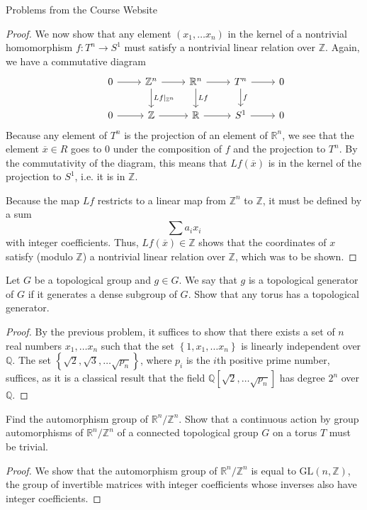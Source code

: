 \documentclass[12pt]{article}
\newcommand{\Q}{\mathbb{Q}}
\newcommand{\Z}{\mathbb{Z}}
\newcommand{\R}{\mathbb{R}}
\theoremstyle{definition}
\newenvironment{problem}[2][Problem]{\begin{trivlist}
\item[\hskip \labelsep {\bfseries #1}\hskip \labelsep {\bfseries #2.}]}{\end{trivlist}}
\begin{document}
\begin{section}{Problems from the Course Website}
\begin{problem}{4}
\begin{proof}
				We now show that any element $(x_1, \dots x_n)$ in the kernel of a nontrivial homomorphism $f: T^n \to S^1$ must satisfy a nontrivial linear relation over $\Z$. Again, we have a commutative diagram
				\[\begin{tikzcd}
					&0 \arrow[r, ""] & \Z^n \arrow[r ] \arrow[d,"Lf \lvert_{\Z^n}"]& \R^n \arrow[r] \arrow[d, "Lf"] & T^n \arrow[d, "f"]\arrow[r] & 0\\
					&0 \arrow[r]& \Z \arrow[r]& \R \arrow[r]& S^1\arrow[r] & 0
			\end{tikzcd}\]
			Because any element of $T^n$ is the projection of an element of $\R^n$, we see that the element $\overline x \in R$ goes to $0$ under the composition of $f$ and the projection to $T^n$. By the commutativity of the diagram, this means that $Lf(\overline x)$ is in the kernel of the projection to $S^1$, i.e. it is in $\Z$. 
			\par Because the map $Lf$ restricts to a linear map from $\Z^n$ to $\Z$, it must be defined by a sum \[\sum a_i x_i\] with integer coefficients. Thus, $Lf(\overline x) \in \Z$ shows that the coordinates of $x$ satisfy (modulo $\Z$) a nontrivial linear relation over $\Z$, which was to be shown.
		\end{proof}
	\end{problem}
	\begin{problem}{5}
		Let $G$ be a topological group and $g \in G$. We say that $g$ is a topological generator of $G$ if it generates a dense subgroup of $G$. Show that any torus has a topological generator.
		\begin{proof}
			By the previous problem, it suffices to show that there exists a set of $n$ real numbers $x_1, \dots x_n$ such that the set $\left\{ 1, x_1, \dots x_n \right\}$ is linearly independent over $\Q$. The set $\left\{\sqrt{2}, \sqrt{3}, \dots \sqrt{p_n} \right\}$, where $p_i$ is the $i$th positive prime number, suffices, as it is a classical result that the field $\Q[\sqrt{2}, \dots \sqrt{p_n}]$ has degree $2^n$ over $\Q$.
		\end{proof}
	\end{problem}
	\begin{problem}{6}
		Find the automorphism group of $\R^n/\Z^n$. Show that a continuous action by group automorphisms of $\R^n/\Z^n$ of a connected topological group $G$ on a torus $T$ must be trivial.
		\begin{proof}
			We show that the automorphism group of $\R^n/\Z^n$ is equal to $\text{GL}(n,\Z)$, the group of invertible matrices with integer coefficients whose inverses also have integer coefficients.

\end{proof}
\end{problem}
\end{section}
\end{document}
